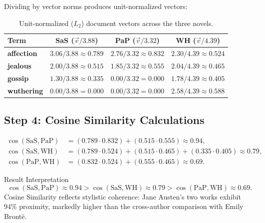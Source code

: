 Dividing by vector norms produces unit-normalized vectors:

\begin{table}[H]
\centering
\begin{tabular}{l ccc}
\toprule
\textbf{Term} & \textbf{SaS ($\vec{v} / 3.88$)} & \textbf{PaP ($\vec{v} / 3.32$)} & \textbf{WH ($\vec{v} / 4.39$)} \\
\midrule
\textbf{affection} & $3.06 / 3.88 \approx \mathbf{0.789}$ & $2.76 / 3.32 \approx \mathbf{0.832}$ & $2.30 / 4.39 \approx \mathbf{0.524}$ \\
\textbf{jealous}   & $2.00 / 3.88 \approx \mathbf{0.515}$ & $1.85 / 3.32 \approx \mathbf{0.555}$ & $2.04 / 4.39 \approx \mathbf{0.465}$ \\
\textbf{gossip}    & $1.30 / 3.88 \approx \mathbf{0.335}$ & $0.00 / 3.32 = \mathbf{0.000}$       & $1.78 / 4.39 \approx \mathbf{0.405}$ \\
\textbf{wuthering} & $0.00 / 3.88 = \mathbf{0.000}$       & $0.00 / 3.32 = \mathbf{0.000}$       & $2.58 / 4.39 \approx \mathbf{0.588}$ \\
\bottomrule
\end{tabular}
\caption{Unit-normalized ($L_2$) document vectors across the three novels.}
\label{tab:novels-normalized-en}
\end{table}

\subsection{Step 4: Cosine Similarity Calculations}
\begin{align}
\cos(\text{SaS}, \text{PaP}) &= (0.789 \cdot 0.832) + (0.515 \cdot 0.555) \approx \mathbf{0.94}, \\[0.2cm]
\cos(\text{SaS}, \text{WH})  &= (0.789 \cdot 0.524) + (0.515 \cdot 0.465) + (0.335 \cdot 0.405) \approx \mathbf{0.79}, \\[0.2cm]
\cos(\text{PaP}, \text{WH})  &= (0.832 \cdot 0.524) + (0.555 \cdot 0.465) \approx \mathbf{0.69}.
\end{align}

\begin{noteblock}{Result Interpretation}
\begin{equation}
\cos(\text{SaS}, \text{PaP}) \approx 0.94 > \cos(\text{SaS}, \text{WH}) \approx 0.79 > \cos(\text{PaP}, \text{WH}) \approx 0.69.
\end{equation}
Cosine Similarity reflects stylistic coherence: Jane Austen's two works exhibit $94\%$ proximity, markedly higher than the cross-author comparison with Emily Bront\"e.
\end{noteblock}

